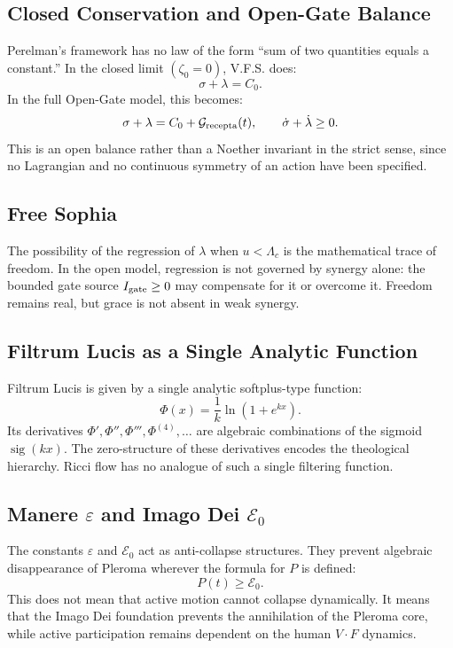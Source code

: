 \documentclass[11pt]{article}
\newcommand{\VFS}{V.F.S.}
\newcommand{\Gate}{I_{\rm gate}}
\newcommand{\Grec}{\mathcal{G}_{\rm recepta}}
\newcommand{\Ezero}{\mathcal{E}_0}
\newcommand{\Lc}{\Lambda_c}
\begin{document}
\subsection{Closed Conservation and Open-Gate Balance}

Perelman's framework has no law of the form ``sum of two quantities equals a constant.'' In the closed limit $(\zeta_0=0)$, \VFS{} does:
\begin{equation}
\sigma+\lambda=C_0.
\end{equation}
In the full Open-Gate model, this becomes:
\begin{equation}
\sigma+\lambda=C_0+\Grec(t),
\qquad
\dot\sigma+\dot\lambda\ge0.
\end{equation}
This is an open balance rather than a Noether invariant in the strict sense, since no Lagrangian and no continuous symmetry of an action have been specified.

\subsection{Free Sophia}

The possibility of the regression of $\lambda$ when $u<\Lc$ is the mathematical trace of freedom. In the open model, regression is not governed by synergy alone: the bounded gate source $\Gate\ge0$ may compensate for it or overcome it. Freedom remains real, but grace is not absent in weak synergy.

\subsection{Filtrum Lucis as a Single Analytic Function}

Filtrum Lucis is given by a single analytic softplus-type function:
\begin{equation}
\Phi(x)=\frac{1}{k}\ln(1+e^{kx}).
\end{equation}
Its derivatives $\Phi',\Phi'',\Phi''',\Phi^{(4)},\ldots$ are algebraic combinations of the sigmoid $\operatorname{sig}(kx)$. The zero-structure of these derivatives encodes the theological hierarchy. Ricci flow has no analogue of such a single filtering function.

\subsection{Manere $\varepsilon$ and Imago Dei $\Ezero$}

The constants $\varepsilon$ and $\Ezero$ act as anti-collapse structures. They prevent algebraic disappearance of Pleroma wherever the formula for $P$ is defined:
\begin{equation}
P(t)\ge \Ezero.
\end{equation}
This does not mean that active motion cannot collapse dynamically. It means that the Imago Dei foundation prevents the annihilation of the Pleroma core, while active participation remains dependent on the human $V\cdot F$ dynamics.
\end{document}
